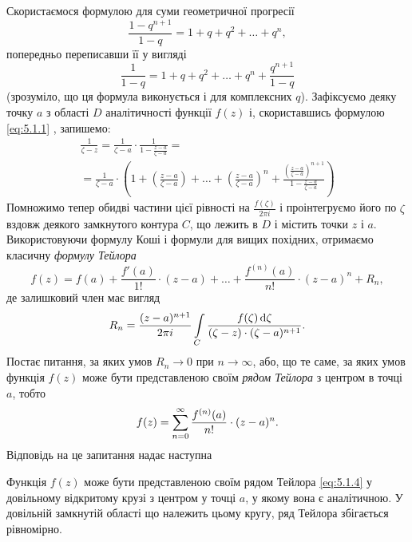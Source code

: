 Скористаємося формулою для суми геометричної прогресії
\begin{equation*}
	\frac{1 - q^{n + 1}}{1 - q} = 1 + q + q^2 + \ldots + q^n,
\end{equation*}
попередньо переписавши її у вигляді 
\begin{equation}
	\label{eq:5.1.1}
	\frac{1}{1 - q} = 1 + q + q^2 + \ldots + q^n + \frac{q^{n + 1}}{1 - q}
\end{equation}
(зрозуміло, що ця формула виконується і для комплексних $q$). Зафіксуємо деяку точку $a$ з області $D$ аналітичності функції $f(z)$ і, скориставшись формулою \eqref{eq:5.1.1} %
, запишемо:
\begin{multline*}
	\frac{1}{\zeta - z} = \frac{1}{\zeta - a} \cdot \frac{1}{1 - \frac{z - a}{\zeta - a}} = \\ = \frac{1}{\zeta - a} \cdot \left( 1 + \left(\frac{z - a}{\zeta - a}\right) + \ldots + \left(\frac{z - a}{\zeta - a}\right)^n + \frac{\left(\frac{z - a}{\zeta - a}\right)^{n + 1}}{1 - \frac{z - a}{\zeta - a}} \right)
\end{multline*}
Помножимо тепер обидві частини цієї рівності на $\frac{f(\zeta)}{2\pi i}$ і проінтегруємо його по $\zeta$ вздовж деякого замкнутого контура $C$, що лежить в $D$ і містить точки $z$ і $a$. Використовуючи формулу Коші і формули для вищих похідних, отримаємо класичну \textit{формулу Тейлора}
\begin{equation}
	\label{eq:5.1.2}
	f(z) = f(a) + \frac{f'(a)}{1!} \cdot (z - a) + \ldots + \frac{f^{(n)}(a)}{n!} \cdot (z - a)^n + R_n,
\end{equation}
де залишковий член має вигляд
\begin{equation}
	\label{eq:5.1.3}
	R_n = \frac{(z - a)^{n + 1}}{2 \pi i} \displaystyle\int\limits_C \frac{f(\zeta) \mathop{}\!\mathrm{d} \zeta}{(\zeta - z) \cdot (\zeta - a)^{n + 1}}.
\end{equation}
Постає питання, за яких умов $R_n \to 0$ при $n \to \infty$, або, що те саме, за яких умов функція $f(z)$ може бути представленою своїм \textit{рядом Тейлора} з центром в точці $a$, тобто
\begin{equation}
	\label{eq:5.1.4}
	f(z) = \displaystyle\sum\limits_{n = 0}^\infty \frac{f^{(n)}(a)}{n!} \cdot (z - a)^n.
\end{equation}
Відповідь на це запитання надає наступна
\begin{theorem}[О. Коші, 1831 р.]
	Функція $f(z)$ може бути представленою своїм рядом Тейлора \eqref{eq:5.1.4} %
	 у довільному відкритому крузі з центром у точці $a$, у якому вона є аналітичною. У довільній замкнутій області що належить цьому кругу, ряд Тейлора збігається рівномірно.
\end{theorem}
